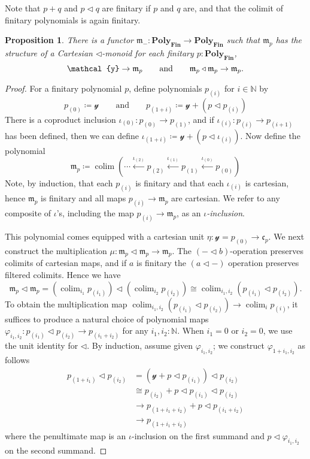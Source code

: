 \documentclass[11pt, one side, article]{memoir}
\theoremstyle{definition}
\theoremstyle{plain}
\newtheorem{proposition}[definitionx]{Proposition}
\DeclareMathOperator*{\colim}{colim}
\newcommand{\Cat}[1]{\mathbf{#1}}%
\newcommand{\From}[1]{\xleftarrow{#1}}
\newcommand{\nn}{\mathbb{N}}
\newcommand{\finset}{\Cat{Fin}}
\newcommand{\polyfin}{\poly_{\finset}}
\newcommand{\yon}{\mathcal{y}}
\newcommand{\poly}{\Cat{Poly}}
\newcommand{\tri}{\mathbin{\triangleleft}}
\newcommand{\free}{\mathfrak{m}}
\newcommand{\cofree}{\mathfrak{c}}
\newcommand{\qqand}{\qquad\text{and}\qquad}
\newcommand{\hoc}[1]{_{(#1)}}
\begin{document}
Note that $p+q$ and $p\tri q$ are finitary if $p$ and $q$ are, and that the colimit of finitary polynomials is again finitary.


\begin{proposition}\label{prop.free_monad_fin}
There is a functor $\free_-\colon\polyfin\to\polyfin$ such that $\free_p$ has the structure of a Cartesian $\tri$-monoid for each finitary $p:\polyfin$,
\[
\yon\to\free_p
\qqand
\free_p\tri\free_p\to\free_p.
\qedhere
\]
\end{proposition}
\begin{proof}
For a finitary polynomial $p$, define polynomials $p\hoc{i}$ for $i\in\nn$ by
\[
p\hoc{0}\coloneqq\yon
\qqand
p\hoc{1+i}\coloneqq\yon+\left(p\tri p\hoc{i}\right)
\]
There is a coproduct inclusion $\iota\hoc{0}\colon p\hoc{0}\to p\hoc{1}$, and if $\iota\hoc{i}\colon p\hoc{i}\to p\hoc{i+1}$ has been defined, then we can define $\iota\hoc{1+i}\coloneqq \yon+(p\tri\iota\hoc{i})$. Now define the polynomial
\begin{equation}
	\free_p\coloneqq\colim\left(\cdots\From{\iota\hoc{2}}p\hoc{2}\From{\iota\hoc{1}}p\hoc{1}\From{\iota\hoc{0}}p\hoc{0}\right)
\end{equation}
Note, by induction, that each $p\hoc{i}$ is finitary and that each $\iota\hoc{i}$ is cartesian, hence $\free_p$ is finitary and all maps $p\hoc{i}\to\free_p$ are cartesian. We refer to any composite of $\iota$'s, including the map $p\hoc{i}\to\free_p$, as an \emph{$\iota$-inclusion}.

This polynomial comes equipped with a cartesian unit $\eta\colon\yon=p\hoc{0}\to\cofree_p$. We next construct the multiplication $\mu\colon\free_p\tri\free_p\to\free_p$. The $(-\tri b)$-operation preserves colimits of cartesian maps, and if $a$ is finitary the $(a\tri-)$ operation preserves filtered colimits. Hence we have
\[
	\free_p\tri\free_p=
  \left(\colim_{i_1}p\hoc{i_1}\right)\tri\left(\colim_{i_2}p\hoc{i_2}\right)\cong
  \colim_{i_1,i_2}\left(p\hoc{i_1}\tri p\hoc{i_2}\right).
\]
To obtain the multiplication map $\colim_{i_1,i_2}(p\hoc{i_1}\tri p\hoc{i_2})\to\colim_i p\hoc{i}$, it suffices to produce a natural choice of polynomial maps $\varphi_{i_1,i_2}\colon p\hoc{i_1}\tri p\hoc{i_2}\to p\hoc{i_1+i_2}$ for any $i_1,i_2:\nn$. When $i_1=0$ or $i_2=0$, we use the unit identity for $\tri$. By induction, assume given $\varphi_{i_1,i_2}$; we construct $\varphi_{1+i_1,i_2}$ as follows
\begin{align*}
	p\hoc{1+i_1}\tri p\hoc{i_2}&=
	\left(\yon+p\tri p\hoc{i_1}\right)\tri p\hoc{i_2}\\&\cong
	p\hoc{i_2}+p\tri p\hoc{i_1}\tri p\hoc{i_2}\\&\to
	p\hoc{1+i_1+i_2}+p\tri p\hoc{i_1+i_2}\\&\to
	p\hoc{1+i_1+i_2}
\end{align*}
where the penultimate map is an $\iota$-inclusion on the first summand and $p\tri\varphi_{i_1,i_2}$ on the second summand.


\end{proof}
\end{document}
